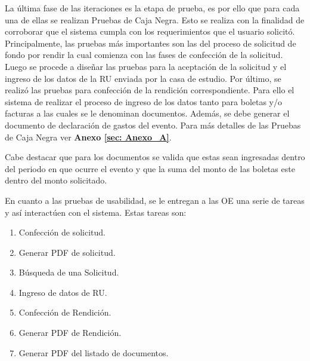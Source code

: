 La última fase de las iteraciones es la etapa de prueba, es por ello que para cada una de ellas se realizan Pruebas de Caja Negra. Esto se realiza con la finalidad de corroborar que el sistema cumpla con los requerimientos que el usuario solicitó. Principalmente, las pruebas más importantes son las del proceso de solicitud de fondo por rendir la cual comienza con las fases de confección de la solicitud. Luego se procede a diseñar las pruebas para la aceptación de la solicitud y el ingreso de los datos de la RU enviada por la casa de estudio. Por último, se realizó las pruebas para confección de la rendición correspondiente. Para ello el sistema de realizar el proceso de ingreso de los datos tanto para boletas y/o facturas a las cuales se le denominan documentos. Además, se debe generar el documento de declaración de gastos del evento. Para más detalles de las Pruebas de Caja Negra ver \textbf{Anexo \ref{sec: Anexo_A}}.

Cabe destacar que para los documentos se valida que estas sean ingresadas dentro del periodo en que ocurre el evento y que la suma del monto de las boletas este dentro del monto solicitado. 

En cuanto a las pruebas de usabilidad, se le entregan a las OE una serie de tareas y así interactúen con el sistema. Estas tareas son: 

\begin{enumerate}
    \item Confección de solicitud.
    \item Generar PDF de solicitud.
    \item Búsqueda de una Solicitud.
    \item Ingreso de datos de RU.
    \item Confección de Rendición.
    \item Generar PDF de Rendición.
    \item Generar PDF del listado de documentos.
\end{enumerate}


